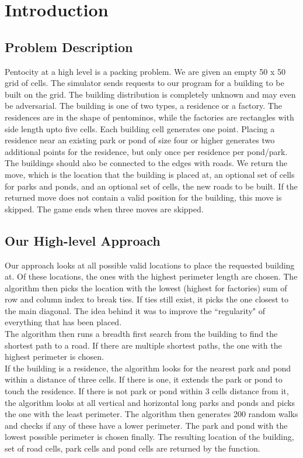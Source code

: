 \section{Introduction}
\subsection{Problem Description}
Pentocity at a high level is a packing problem. We are given an empty 50 x 50 grid of cells. The simulator sends requests to our program for a building to be built on the grid. The building distribution is completely unknown and may even be adversarial. The building is one of two types, a residence or a factory. The residences are in the shape of pentominos, while the factories are rectangles with side length upto five cells. Each building cell generates one point. Placing a residence near an existing park or pond of size four or higher generates two additional points for the residence, but only once per residence per pond/park. The buildings should also be connected to the edges with roads. We return the move, which is the location that the building is placed at, an optional set of cells for parks and ponds, and an optional set of cells, the new roads to be built. If the returned move does not contain a valid position for the building, this move is skipped. The game ends when three moves are skipped.\\
\subsection{Our High-level Approach}
Our approach looks at all possible valid locations to place the requested building at. Of these locations, the ones with the highest perimeter length are chosen. The algorithm then picks the location with the lowest (highest for factories) sum of row and column index to break ties. If ties still exist, it picks the one closest to the main diagonal.
The idea behind it was to improve the ``regularity" of everything that has been placed.\\
The algorithm then runs a breadth first search from the building to find the shortest path to a road. If there are multiple shortest paths, the one with the highest perimeter is chosen.\\
If the building is a residence, the algorithm looks for the nearest park and pond within a distance of three cells. If there is one, it extends the park or pond to touch the residence. If there is not park or pond within 3 cells distance from it, the algorithm looks at all vertical and horizontal long parks and ponds and picks the one with the least perimeter. The algorithm then generates 200 random walks and checks if any of these have a lower perimeter. The park and pond with the lowest possible perimeter is chosen finally. The resulting location of the building, set of road cells, park cells and pond cells are returned by the function.
